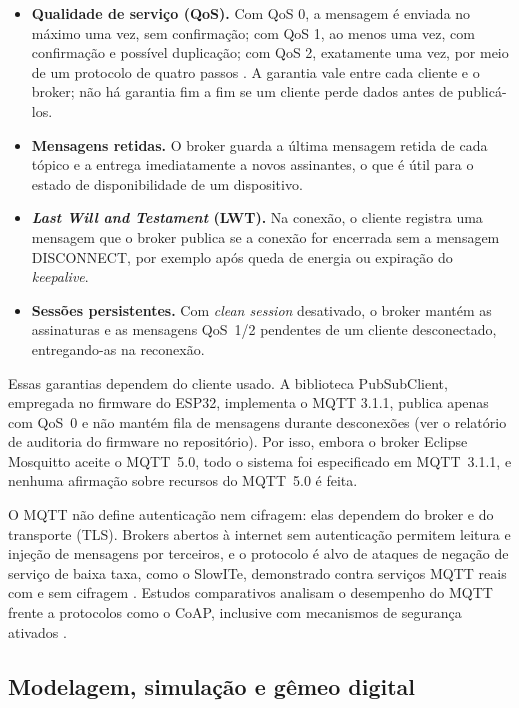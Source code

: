 \begin{itemize}
  \item \textbf{Qualidade de serviço (QoS).} Com QoS 0, a mensagem é enviada no
  máximo uma vez, sem confirmação; com QoS 1, ao menos uma vez, com
  confirmação e possível duplicação; com QoS 2, exatamente uma vez, por meio
  de um protocolo de quatro passos \cite{banks2014mqtt}. A garantia vale entre
  cada cliente e o broker; não há garantia fim a fim se um cliente perde dados
  antes de publicá-los.
  \item \textbf{Mensagens retidas.} O broker guarda a última mensagem retida de
  cada tópico e a entrega imediatamente a novos assinantes, o que é útil para
  o estado de disponibilidade de um dispositivo.
  \item \textbf{\emph{Last Will and Testament} (LWT).} Na conexão, o cliente
  registra uma mensagem que o broker publica se a conexão for encerrada sem a
  mensagem DISCONNECT, por exemplo após queda de energia ou expiração do
  \emph{keepalive}.
  \item \textbf{Sessões persistentes.} Com \emph{clean session} desativado, o
  broker mantém as assinaturas e as mensagens QoS~1/2 pendentes de um cliente
  desconectado, entregando-as na reconexão.
\end{itemize}

Essas garantias dependem do cliente usado. A biblioteca PubSubClient, empregada
no firmware do ESP32, implementa o MQTT 3.1.1, publica apenas com QoS~0 e não
mantém fila de mensagens durante desconexões (ver o relatório de auditoria do
firmware no repositório). Por isso, embora o broker Eclipse Mosquitto
\cite{light2017mosquitto} aceite o MQTT~5.0, todo o sistema foi especificado em
MQTT~3.1.1, e nenhuma afirmação sobre recursos do MQTT~5.0 é feita.

O MQTT não define autenticação nem cifragem: elas dependem do broker e do
transporte (TLS). Brokers abertos à internet sem autenticação permitem leitura
e injeção de mensagens por terceiros, e o protocolo é alvo de ataques de negação de
serviço de baixa taxa, como o SlowITe, demonstrado contra serviços MQTT reais
com e sem cifragem \cite{vaccari2020slowite}. Estudos comparativos analisam o desempenho do MQTT
frente a protocolos como o CoAP, inclusive com mecanismos de segurança ativados
\cite{seoane2021performance}.

\subsection{Modelagem, simulação e gêmeo digital}

